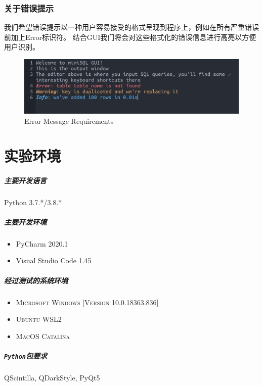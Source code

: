 \documentclass[UTF8]{ctexrep} %
\begin{document}
\subsection{关于错误提示}
我们希望错误提示以一种用户容易接受的格式呈现到程序上，例如在所有严重错误前加上Error标识符。
结合GUI我们将会对这些格式化的错误信息进行高亮以方便用户识别。
\begin{figure}[H]
    \centering
    \includegraphics[width=\linewidth]{figure/error_requirements.png}
    \caption{Error Message Requirements}
    \label{fig:error_message_requirements}
\end{figure}

\chapter{实验环境}
\paragraph{主要开发语言}Python 3.7.*/3.8.*
\paragraph{主要开发环境}
\begin{itemize}
    \item PyCharm 2020.1
    \item Visual Studio Code 1.45
\end{itemize}
\paragraph{经过测试的系统环境}
\begin{itemize}
    \item \textsc{Microsoft Windows [Version 10.0.18363.836]}
    \item \textsc{Ubuntu WSL2}
    \item \textsc{MacOS Catalina}
\end{itemize}
\paragraph{\texttt{Python}包要求}QScintilla, QDarkStyle, PyQt5
\end{document}
